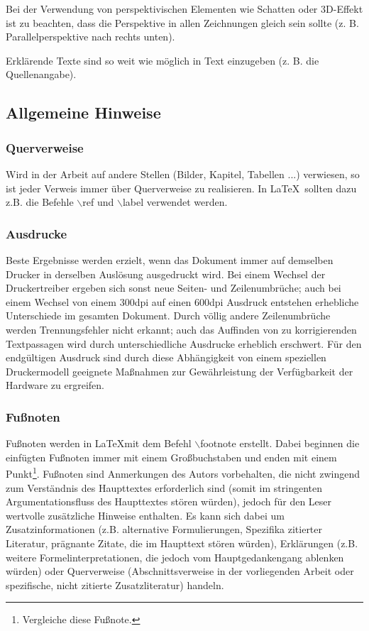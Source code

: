 \documentclass[11pt]{scrartcl}
\begin{document}
Bei der Verwendung von perspektivischen Elementen wie Schatten oder 3D-Effekt ist zu beachten, dass die Perspektive in allen Zeichnungen gleich sein sollte (z. B. Parallelperspektive nach rechts unten).

Erklärende Texte sind so weit wie möglich in Text einzugeben (z. B. die Quellenangabe).
 

\subsection{Allgemeine Hinweise}
\subsubsection{Querverweise}
Wird in der Arbeit auf andere Stellen (Bilder, Kapitel, Tabellen ...) verwiesen, so ist jeder Verweis immer über Querverweise zu realisieren. In \LaTeX\  sollten dazu z.B. die Befehle $\backslash$ref und $\backslash$label verwendet werden.

\subsubsection{Ausdrucke}
Beste Ergebnisse werden erzielt, wenn das Dokument immer auf demselben Drucker in derselben Auslösung ausgedruckt wird. Bei einem Wechsel der Druckertreiber ergeben sich sonst neue Seiten- und Zeilenumbrüche; auch bei einem Wechsel von einem 300dpi auf einen 600dpi Ausdruck entstehen erhebliche Unterschiede im gesamten Dokument. Durch völlig andere Zeilenumbrüche werden Trennungsfehler nicht erkannt; auch das Auffinden von zu korrigierenden Textpassagen wird durch unterschiedliche Ausdrucke erheblich erschwert. Für den endgültigen Ausdruck sind durch diese Abhängigkeit von einem speziellen Druckermodell geeignete Maßnahmen zur Gewährleistung der Verfügbarkeit  der Hardware zu ergreifen.

\subsubsection{Fußnoten}
Fußnoten werden in \LaTeX mit dem Befehl $\backslash$footnote erstellt. Dabei beginnen die einfügten Fußnoten immer mit einem Großbuchstaben und enden mit einem Punkt\footnote{Vergleiche diese Fußnote.}. Fußnoten sind Anmerkungen des Autors vorbehalten, die nicht zwingend zum Verständnis des Haupttextes erforderlich sind (somit im stringenten Argumentationsfluss des Haupttextes stören würden), jedoch für den Leser wertvolle zusätzliche Hinweise enthalten. Es kann sich dabei um Zusatzinformationen (z.B. alternative Formulierungen, Spezifika zitierter Literatur, prägnante Zitate, die im Haupttext stören würden), Erklärungen (z.B. weitere Formelinterpretationen, die jedoch vom Hauptgedankengang ablenken würden) oder Querverweise (Abschnittsverweise in der vorliegenden Arbeit oder spezifische, nicht zitierte Zusatzliteratur) handeln.
\end{document}
